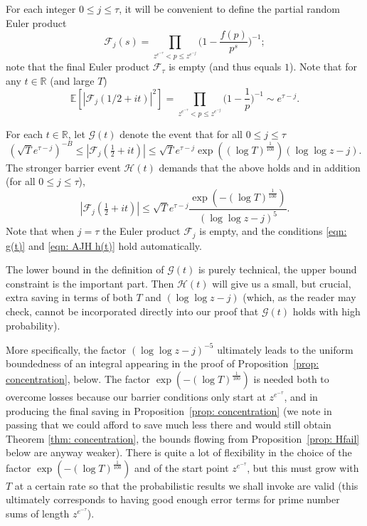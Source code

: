 \documentclass[12pt, notitlepage]{amsart}
\numberwithin{equation}{section}
\def\R{\mathbb R}
\def\E{\mathbb E}
\theoremstyle{remark}
\theoremstyle{definition}
\theoremstyle{remark}
\numberwithin{equation}{section}
\begin{document}
 For each integer $0\le j\le \tau$, it will be convenient to define the partial random Euler product 
 \begin{equation} 
 \label{3.3} 
 {\mathcal F}_j(s) = \prod_{z^{e^{-\tau}} < p \le z^{e^{-j}}} \Big( 1- \frac{f(p)}{p^s}\Big)^{-1}; 
 \end{equation} 
 note that the final Euler product ${\mathcal F}_\tau$ is empty (and thus equals $1$). 
 Note that for any $t\in \R$ (and large $T$) 
 \begin{equation} 
 \label{3.4} 
 \E[ |{\mathcal F}_j(1/2+it)|^2 ] = \prod_{z^{e^{-\tau}} < p \le z^{e^{-j}}} \Big( 1- \frac{1}{p}\Big)^{-1} \sim e^{\tau-j}.
 \end{equation} 

For each $t \in \R$, let $\mathcal{G}(t)$ denote the event that for all $0\le j\le \tau$ 
\begin{equation}\label{eqn: g(t)}
     (\sqrt{T} e^{\tau-j})^{-B}  \le |{\mathcal F}_j(\tfrac 1 2 +it)|  \le \sqrt{T} e^{\tau-j}\exp((\log T)^{\frac 1{100}}) (\log \log z - j).   
\end{equation}
The stronger barrier event $\mathcal{H}(t)$ demands that the above holds and in addition (for all $0\le j\le \tau$), 
\begin{equation}\label{eqn: AJH h(t)}
|{\mathcal F}_j(\tfrac 12+it)| \le \sqrt{T} e^{\tau-j}  \frac{\exp(-(\log T)^{\frac 1{100}})}{ (\log \log z - j)^{5}}.  
\end{equation}
Note that when $j=\tau$ the Euler product ${\mathcal F}_j$ is empty, and the conditions \eqref{eqn: g(t)} and \eqref{eqn: AJH h(t)} hold automatically. 

The lower bound in the definition of $\mathcal{G}(t)$ is purely technical, the upper bound constraint is the important part. Then $\mathcal{H}(t)$ will give us a small, but crucial, extra saving in terms of both $T$ and $(\log\log z - j)$ (which, as the reader may check, cannot be incorporated directly into our proof that $\mathcal{G}(t)$ holds with high probability).

More specifically, the factor $(\log \log z - j)^{-5}$ ultimately leads to the uniform boundedness of an integral appearing in the proof of Proposition~\ref{prop: concentration}, below. The factor $\exp(-(\log T)^{\frac 1{100}})$ is needed both to overcome losses because our barrier conditions only start at $z^{e^{-\tau}}$, and in producing the final saving in Proposition~\ref{prop: concentration} (we note in passing that we could afford to save much less there and would still obtain Theorem \ref{thm: concentration}, the bounds flowing from Proposition~\ref{prop: Hfail} below are anyway weaker). There is quite a lot of flexibility in the choice of the factor $\exp(-(\log T)^{\frac 1{100}})$ and of the start point $z^{e^{-\tau}}$, but this must grow with $T$ at a certain rate so that the probabilistic results we shall invoke are valid (this ultimately corresponds to having good enough error terms for prime number sums of length $z^{e^{-\tau}}$).
\end{document}
